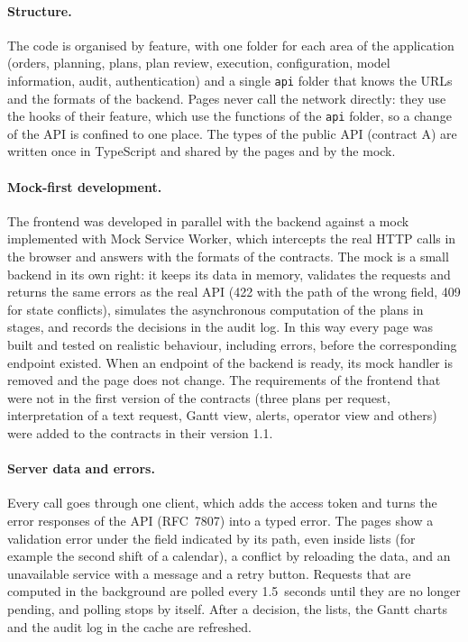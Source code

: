 \paragraph{Structure.} The code is organised by feature, with one folder for each area of the
application (orders, planning, plans, plan review, execution, configuration, model information,
audit, authentication) and a single \texttt{api} folder that knows the URLs and the formats of
the backend. Pages never call the network directly: they use the hooks of their feature, which
use the functions of the \texttt{api} folder, so a change of the API is confined to one place.
The types of the public API (contract A) are written once in TypeScript and shared by the pages
and by the mock.

\paragraph{Mock-first development.} The frontend was developed in parallel with the backend
against a mock implemented with Mock Service Worker, which intercepts the real HTTP calls in the
browser and answers with the formats of the contracts. The mock is a small backend in its own
right: it keeps its data in memory, validates the requests and returns the same errors as the
real API (422 with the path of the wrong field, 409 for state conflicts), simulates the
asynchronous computation of the plans in stages, and records the decisions in the audit log. In
this way every page was built and tested on realistic behaviour, including errors, before the
corresponding endpoint existed. When an endpoint of the backend is ready, its mock handler is
removed and the page does not change. The requirements of the frontend that were not in the
first version of the contracts (three plans per request, interpretation of a text request,
Gantt view, alerts, operator view and others) were added to the contracts in their version 1.1.

\paragraph{Server data and errors.} Every call goes through one client, which adds the access
token and turns the error responses of the API (RFC~7807) into a typed error. The pages show a
validation error under the field indicated by its path, even inside lists (for example the
second shift of a calendar), a conflict by reloading the data, and an unavailable service with a
message and a retry button. Requests that are computed in the background are polled every
1.5~seconds until they are no longer pending, and polling stops by itself. After a decision,
the lists, the Gantt charts and the audit log in the cache are refreshed.

